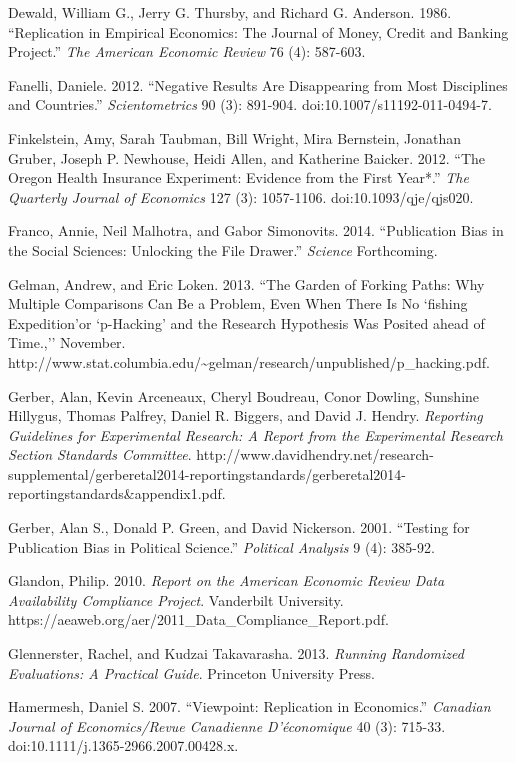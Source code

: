 \documentclass[12pt] {article}
\begin{document}
Dewald, William G., Jerry G. Thursby, and Richard G. Anderson. 1986.
``Replication in Empirical Economics: The Journal of Money, Credit and
Banking Project.'' \emph{The American Economic Review} 76 (4): 587-603.

Fanelli, Daniele. 2012. ``Negative Results Are Disappearing from Most
Disciplines and Countries.'' \emph{Scientometrics} 90 (3): 891-904.
doi:10.1007/s11192-011-0494-7.

Finkelstein, Amy, Sarah Taubman, Bill Wright, Mira Bernstein, Jonathan
Gruber, Joseph P. Newhouse, Heidi Allen, and Katherine Baicker. 2012.
``The Oregon Health Insurance Experiment: Evidence from the First
Year*.'' \emph{The Quarterly Journal of Economics} 127 (3): 1057-1106.
doi:10.1093/qje/qjs020.

Franco, Annie, Neil Malhotra, and Gabor Simonovits. 2014. ``Publication
Bias in the Social Sciences: Unlocking the File Drawer.'' \emph{Science}
Forthcoming.

Gelman, Andrew, and Eric Loken. 2013. ``The Garden of Forking Paths: Why
Multiple Comparisons Can Be a Problem, Even When There Is No `fishing
Expedition'or `p-Hacking' and the Research Hypothesis Was Posited ahead
of Time.,'' November.
http://www.stat.columbia.edu/\textasciitilde{}gelman/research/unpublished/p\_hacking.pdf.

Gerber, Alan, Kevin Arceneaux, Cheryl Boudreau, Conor Dowling, Sunshine
Hillygus, Thomas Palfrey, Daniel R. Biggers, and David J. Hendry.
\emph{Reporting Guidelines for Experimental Research: A Report from the
Experimental Research Section Standards Committee}.
http://www.davidhendry.net/research-supplemental/gerberetal2014-reportingstandards/gerberetal2014-reportingstandards\&appendix1.pdf.

Gerber, Alan S., Donald P. Green, and David Nickerson. 2001. ``Testing
for Publication Bias in Political Science.'' \emph{Political Analysis} 9
(4): 385-92.

Glandon, Philip. 2010. \emph{Report on the American Economic Review Data
Availability Compliance Project}. Vanderbilt University.
https://aeaweb.org/aer/2011\_Data\_Compliance\_Report.pdf.

Glennerster, Rachel, and Kudzai Takavarasha. 2013. \emph{Running
Randomized Evaluations: A Practical Guide}. Princeton University Press.

Hamermesh, Daniel S. 2007. ``Viewpoint: Replication in Economics.''
\emph{Canadian Journal of Economics/Revue Canadienne D'économique} 40
(3): 715-33. doi:10.1111/j.1365-2966.2007.00428.x.
\end{document}
